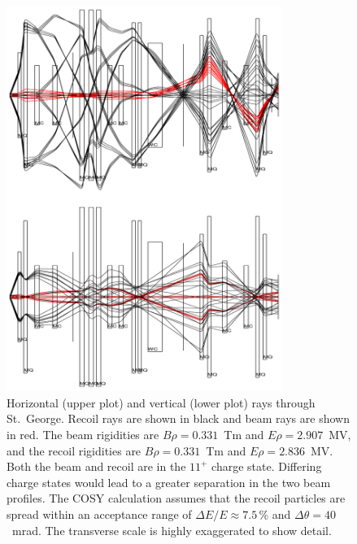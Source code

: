 \begin{figure}
    \begin{center}
        \centerline{
            \includegraphics[width=0.8\textwidth]{figures/raytrace.png}}
        \caption[Horizontal and vertical rays through St.\
            George]{Horizontal (upper plot) and vertical (lower plot)
            rays through St.\ George. Recoil \nuc{41}{Sc} rays are shown
            in black and beam \nuc{40}{Ca} rays are shown in red.
            The beam rigidities are $B\rho = 0.331$~Tm and $E\rho =
            2.907$~MV, and the recoil rigidities are $B\rho = 0.331$~Tm
            and $E\rho = 2.836$~MV. Both the beam and recoil are in the
            $11^+$ charge state. Differing charge states would lead to a
            greater separation in the two beam profiles. The COSY
            calculation assumes that the recoil particles are spread
            within an acceptance range of $\Delta E/E \approx7.5$\,\%
            and $\Delta\theta = 40$~mrad. The transverse scale is highly
            exaggerated to show detail.}
        \label{fig:raytrace}
    \end{center}
\end{figure}

